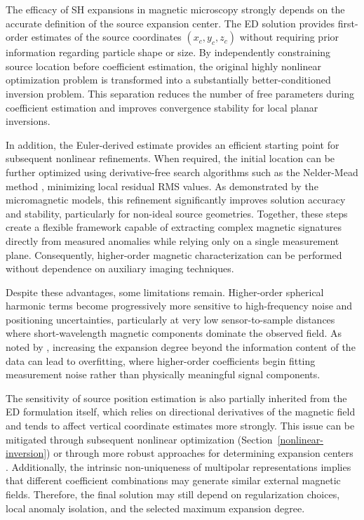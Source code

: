 The efficacy of SH expansions in magnetic microscopy strongly depends on the accurate definition of the source expansion center. The ED solution provides first-order estimates of the source coordinates $(x_c, y_c, z_c)$ without requiring prior information regarding particle shape or size. By independently constraining source location before coefficient estimation, the original highly nonlinear optimization problem is transformed into a substantially better-conditioned inversion problem. This separation reduces the number of free parameters during coefficient estimation and improves convergence stability for local planar inversions.

In addition, the Euler-derived estimate provides an efficient starting point for subsequent nonlinear refinements. When required, the initial location can be further optimized using derivative-free search algorithms such as the Nelder-Mead method \citep{Nelder-Mead1965}, minimizing local residual RMS values. As demonstrated by the micromagnetic models, this refinement significantly improves solution accuracy and stability, particularly for non-ideal source geometries. Together, these steps create a flexible framework capable of extracting complex magnetic signatures directly from measured anomalies while relying only on a single measurement plane. Consequently, higher-order magnetic characterization can be performed without dependence on auxiliary imaging techniques.

Despite these advantages, some limitations remain. Higher-order spherical harmonic terms become progressively more sensitive to high-frequency noise and positioning uncertainties, particularly at very low sensor-to-sample distances where short-wavelength magnetic components dominate the observed field. As noted by \citet{Lima2023}, increasing the expansion degree beyond the information content of the data can lead to overfitting, where higher-order coefficients begin fitting measurement noise rather than physically meaningful signal components.

The sensitivity of source position estimation is also partially inherited from the ED formulation itself, which relies on directional derivatives of the magnetic field and tends to affect vertical coordinate estimates more strongly. This issue can be mitigated through subsequent nonlinear optimization (Section~\ref{nonlinear-inversion}) or through more robust approaches for determining expansion centers \citep[\textit{e.g.} Euler inversion,][]{Uieda2025}. Additionally, the intrinsic non-uniqueness of multipolar representations implies that different coefficient combinations may generate similar external magnetic fields. Therefore, the final solution may still depend on regularization choices, local anomaly isolation, and the selected maximum expansion degree.


